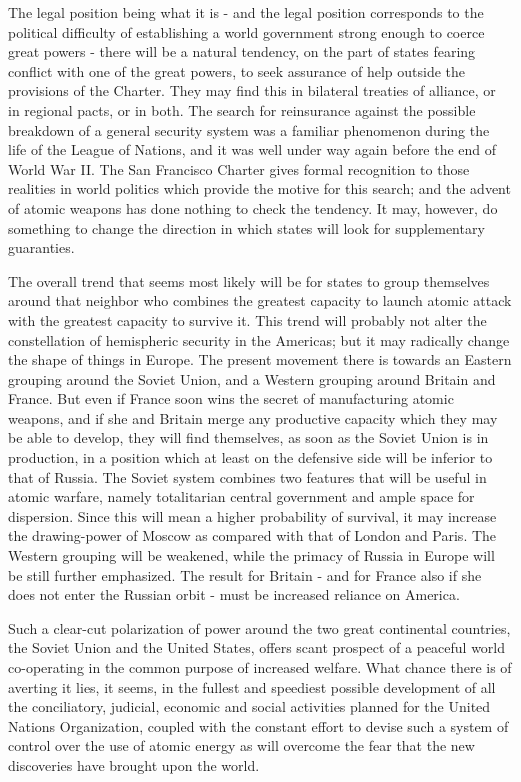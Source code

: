 The legal position being what it is - and the legal position corresponds to the political difficulty of establishing a world government strong enough to coerce great powers - there will be a natural tendency, on the part of states fearing conflict with one of the great powers, to seek assurance of help outside the provisions of the Charter. They may find this in bilateral treaties of alliance, or in regional pacts, or in both. The search for reinsurance against the possible breakdown of a general security system was a familiar phenomenon during the life of the League of Nations, and it was well under way again before the end of World War II. The San Francisco Charter gives formal recognition to those realities in world politics which provide the motive for this search; and the advent of atomic weapons has done nothing to check the tendency. It may, however, do something to change the direction in which states will look for supplementary guaranties.

The overall trend that seems most likely will be for states to group themselves around that neighbor who combines the greatest capacity to launch atomic attack with the greatest capacity to survive it. This trend will probably not alter the constellation of hemispheric security in the Americas; but it may radically change the shape of things in Europe. The present movement there is towards an Eastern grouping around the Soviet Union, and a Western grouping around Britain and France. But even if France soon wins the secret of manufacturing atomic weapons, and if she and Britain merge any productive capacity which they may be able to develop, they will find themselves, as soon as the Soviet Union is in production, in a position which at least on the defensive side will be inferior to that of Russia. The Soviet system combines two features that will be useful in atomic warfare, namely totalitarian central government and ample space for dispersion. Since this will mean a higher probability of survival, it may increase the drawing-power of Moscow as compared with that of London and Paris. The Western grouping will be weakened, while the primacy of Russia in Europe will be still further emphasized. The result for Britain - and for France also if she does not enter the Russian orbit - must be increased reliance on America.

Such a clear-cut polarization of power around the two great continental countries, the Soviet Union and the United States, offers scant prospect of a peaceful world co-operating in the common purpose of increased welfare. What chance there is of averting it lies, it seems, in the fullest and speediest possible development of all the conciliatory, judicial, economic and social activities planned for the United Nations Organization, coupled with the constant effort to devise such a system of control over the use of atomic energy as will overcome the fear that the new discoveries have brought upon the world.

\newpage

\par

~~